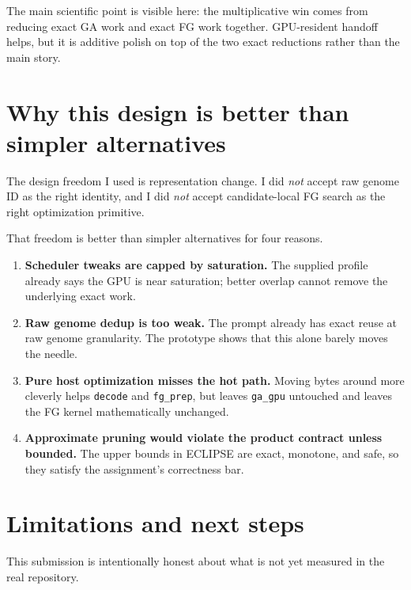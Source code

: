 \documentclass[11pt]{article}
\newcommand{\method}{ECLIPSE}
\begin{document}
The main scientific point is visible here: the multiplicative win comes from reducing exact GA work and exact FG work together. GPU-resident handoff helps, but it is additive polish on top of the two exact reductions rather than the main story.

\section{Why this design is better than simpler alternatives}

The design freedom I used is representation change. I did \emph{not} accept raw genome ID as the right identity, and I did \emph{not} accept candidate-local FG search as the right optimization primitive.

That freedom is better than simpler alternatives for four reasons.

\begin{enumerate}
    \item \textbf{Scheduler tweaks are capped by saturation.} The supplied profile already says the GPU is near saturation; better overlap cannot remove the underlying exact work.
    \item \textbf{Raw genome dedup is too weak.} The prompt already has exact reuse at raw genome granularity. The prototype shows that this alone barely moves the needle.
    \item \textbf{Pure host optimization misses the hot path.} Moving bytes around more cleverly helps \texttt{decode} and \texttt{fg\_prep}, but leaves \texttt{ga\_gpu} untouched and leaves the FG kernel mathematically unchanged.
    \item \textbf{Approximate pruning would violate the product contract unless bounded.} The upper bounds in \method{} are exact, monotone, and safe, so they satisfy the assignment's correctness bar.
\end{enumerate}

\section{Limitations and next steps}

This submission is intentionally honest about what is not yet measured in the real repository.
\end{document}
